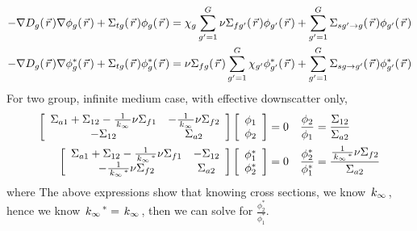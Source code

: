 \documentclass{school-22.211-notes}
\begin{document}
\clearpage
{}
\begin{align}
 -\nabla D_g (\left.\vec{r}\right.) \nabla \phi_g(\left.\vec{r}\right.) + \Sigma_{tg} (\left.\vec{r}\right.) \phi_g(\left.\vec{r}\right.) &= \chi_g \displaystyle\sum_{g'=1}^G \nu \Sigma_{fg'} (\left.\vec{r}\right.) \phi_{g'}(\left.\vec{r}\right.) + \displaystyle\sum_{g'=1}^G \Sigma_{sg'\to g} (\left.\vec{r}\right.) \phi_{g'}(\left.\vec{r}\right.) \\
 -\nabla D_g (\left.\vec{r}\right.) \nabla \phi_g^* (\left.\vec{r}\right.) + \Sigma_{tg} (\left.\vec{r}\right.) \phi_g^* (\left.\vec{r}\right.) &= \nu \Sigma_{fg} (\left.\vec{r}\right.)\displaystyle\sum_{g'=1}^G \chi_{g'} \phi_{g'}^* (\left.\vec{r}\right.) + \displaystyle\sum_{g'=1}^G \Sigma_{sg\to g'} (\left.\vec{r}\right.) \phi_{g'}^*(\left.\vec{r}\right.)
\end{align}
For two group, infinite medium case, with effective downscatter only, 
\begin{align}
\left[ \begin{array}{cc}
\Sigma_{a1} + \Sigma_{12} - \frac{1}{\left. k_{\infty} \right.} \nu \Sigma_{f1} & - \frac{1}{\left. k_{\infty} \right.} \nu \Sigma_{f2} \\
- \Sigma_{12} & \Sigma_{a2} \end{array} \right] 
\left[ \begin{array}{c}
\phi_1 \\ \phi_2 \end{array} \right] &= 0  
&\frac{\phi_2}{\phi_1} &= \frac{\Sigma_{12}}{\Sigma_{a2}}   \\
\left[ \begin{array}{cc}
\Sigma_{a1} + \Sigma_{12} - \frac{1}{\left. k_{\infty} \right.^*} \nu \Sigma_{f1} & - \Sigma_{12} \\
- \frac{1}{\left. k_{\infty} \right.^*} \nu \Sigma_{f2} & \Sigma_{a2} \end{array} \right] 
\left[ \begin{array}{c}
\phi_1^* \\ \phi_2^* \end{array} \right] &= 0  
&\frac{\phi_2^*}{\phi_1^*} &= \frac{\frac{1}{\left. k_{\infty} \right.^*} \nu \Sigma_{f2}}{\Sigma_{a2}}  
\end{align}
where 
The above expressions show that knowing cross sections, we know $\left. k_{\infty} \right.$, hence we know $\left. k_{\infty} \right.^* = \left. k_{\infty} \right.$, then we can solve for $\frac{\phi_2^*}{\phi_1^*}$. 
\end{document}
